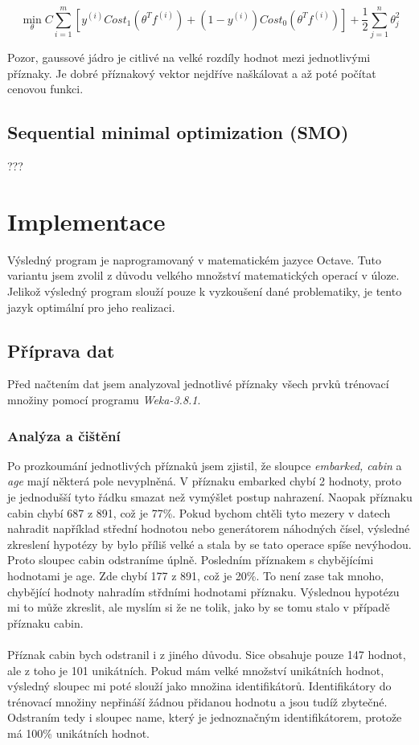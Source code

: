 \documentclass[a4]{article}
\begin{document}
$$\min_{\theta} C \sum_{i=1}^{m}[y^{(i)} Cost_1 (\theta^T f^{(i)})+(1-y^{(i)}) Cost_0 (\theta^T f^{(i)})] + \frac{1}{2} \sum_{j=1}^{n}\theta_{j}^{2}$$

Pozor, gaussové jádro je citlivé na velké rozdíly hodnot mezi jednotlivými příznaky. Je dobré příznakový vektor nejdříve naškálovat a až poté počítat cenovou funkci.

\subsection{Sequential minimal optimization (SMO)}
???

\section{Implementace}
Výsledný program je naprogramovaný v matematickém jazyce Octave. Tuto variantu jsem zvolil z důvodu velkého množství matematických operací v úloze. Jelikož výsledný program slouží pouze k vyzkoušení dané problematiky, je tento jazyk optimální pro jeho realizaci.

\subsection{Příprava dat}
Před načtením dat jsem analyzoval jednotlivé příznaky všech prvků trénovací množiny pomocí programu \textit{Weka-3.8.1}.

\subsubsection{Analýza a čištění}

Po prozkoumání jednotlivých příznaků jsem zjistil, že sloupce \textit{embarked, cabin} a \textit{age} mají některá pole nevyplněná. V příznaku embarked chybí 2 hodnoty, proto je jednodušší tyto řádku smazat než vymýšlet postup nahrazení. Naopak příznaku cabin chybí 
687 z 891, což je 77\%. Pokud bychom chtěli tyto mezery v datech nahradit například střední hodnotou nebo generátorem náhodných čísel, výsledné zkreslení hypotézy by bylo příliš velké a stala by se tato operace spíše nevýhodou. Proto sloupec cabin odstraníme úplně. Posledním příznakem s chybějícími hodnotami je age. Zde chybí 177 z 891, což je 20\%. To není zase tak mnoho, chybějící hodnoty nahradím střdními hodnotami příznaku. Výslednou hypotézu mi to může zkreslit, ale myslím si že ne tolik, jako by se tomu stalo v případě příznaku cabin.
\\\\
Příznak cabin bych odstranil i z jiného důvodu. Sice obsahuje pouze 147 hodnot, ale z toho je 101 unikátních. Pokud mám velké množství unikátních hodnot, výsledný sloupec mi poté slouží jako množina identifikátorů. Identifikátory do trénovací množiny nepřináší žádnou přidanou hodnotu a jsou tudíž zbytečné. Odstraním tedy i sloupec name, který je jednoznačným identifikátorem, protože má 100\% unikátních hodnot.
\end{document}
